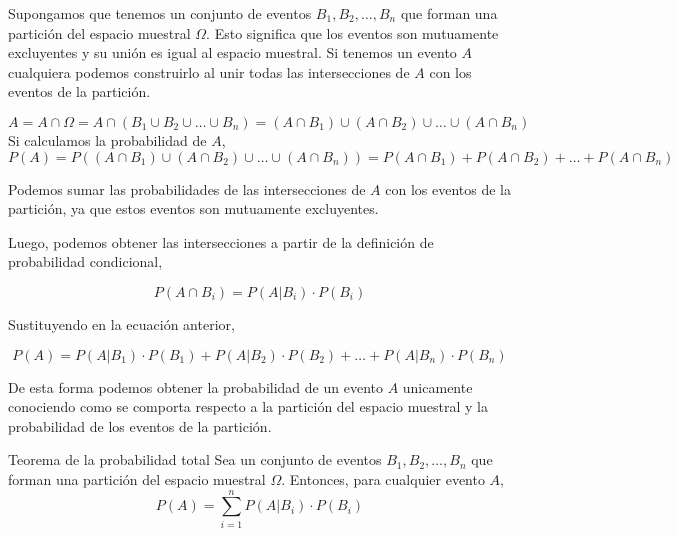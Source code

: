 Supongamos que tenemos un conjunto de eventos $B_1, B_2, \ldots, B_n$ que forman una partición del espacio muestral $\Omega$. Esto significa que los eventos son mutuamente excluyentes y su unión es igual al espacio muestral. Si tenemos un evento $A$ cualquiera podemos construirlo al unir todas las intersecciones de $A$ con los eventos de la partición.

\[
  A = A \cap \Omega = A \cap (B_1 \cup B_2 \cup \ldots \cup B_n) = (A \cap B_1) \cup (A \cap B_2) \cup \ldots \cup (A \cap B_n)
\]
Si calculamos la probabilidad de $A$,
\[
  P(A) = P((A \cap B_1) \cup (A \cap B_2) \cup \ldots \cup (A \cap B_n)) = P(A \cap B_1) + P(A \cap B_2) + \ldots + P(A \cap B_n)
\]

\begin{nota}
  Podemos sumar las probabilidades de las intersecciones de $A$ con los eventos de la partición, ya que estos eventos son mutuamente excluyentes.
\end{nota}

Luego, podemos obtener las intersecciones a partir de la definición de probabilidad condicional,

\[
  P(A \cap B_i) = P(A|B_i) \cdot P(B_i)
\]

Sustituyendo en la ecuación anterior,

\[
  P(A) = P(A|B_1) \cdot P(B_1) + P(A|B_2) \cdot P(B_2) + \ldots + P(A|B_n) \cdot P(B_n)
\]

De esta forma podemos obtener la probabilidad de un evento $A$ unicamente conociendo como se comporta respecto a la partición del espacio muestral y la probabilidad de los eventos de la partición.

\begin{definicion}{Teorema de la probabilidad total}
  Sea un conjunto de eventos $B_1, B_2, \ldots, B_n$ que forman una partición del espacio muestral $\Omega$. Entonces, para cualquier evento $A$,
  \[
    P(A) = \sum_{i=1}^{n} P(A|B_i) \cdot P(B_i)
  \]
\end{definicion}